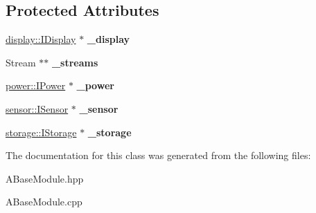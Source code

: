 \subsection*{Protected Attributes}
\begin{DoxyCompactItemize}
\item 
\mbox{\label{classwood_box_1_1module_1_1_a_base_module_a2550178f6fe0a97025e87da03a47d13f}} 
\mbox{\hyperlink{classwood_box_1_1display_1_1_i_display}{display\+::\+I\+Display}} $\ast$ {\bfseries \+\_\+display}
\item 
\mbox{\label{classwood_box_1_1module_1_1_a_base_module_a851b365cdd36435e017297fcfdb8d5e8}} 
Stream $\ast$$\ast$ {\bfseries \+\_\+streams}
\item 
\mbox{\label{classwood_box_1_1module_1_1_a_base_module_a24c92fcd213167f9f917d6637a8df370}} 
\mbox{\hyperlink{classwood_box_1_1power_1_1_i_power}{power\+::\+I\+Power}} $\ast$ {\bfseries \+\_\+power}
\item 
\mbox{\label{classwood_box_1_1module_1_1_a_base_module_a9735d9e5169f0d26c2a9cf2fad3f12a5}} 
\mbox{\hyperlink{classwood_box_1_1sensor_1_1_i_sensor}{sensor\+::\+I\+Sensor}} $\ast$ {\bfseries \+\_\+sensor}
\item 
\mbox{\label{classwood_box_1_1module_1_1_a_base_module_aa187748e43497da9786e37c777948901}} 
\mbox{\hyperlink{classwood_box_1_1storage_1_1_i_storage}{storage\+::\+I\+Storage}} $\ast$ {\bfseries \+\_\+storage}
\end{DoxyCompactItemize}


The documentation for this class was generated from the following files\+:\begin{DoxyCompactItemize}
\item 
A\+Base\+Module.\+hpp\item 
A\+Base\+Module.\+cpp\end{DoxyCompactItemize}
